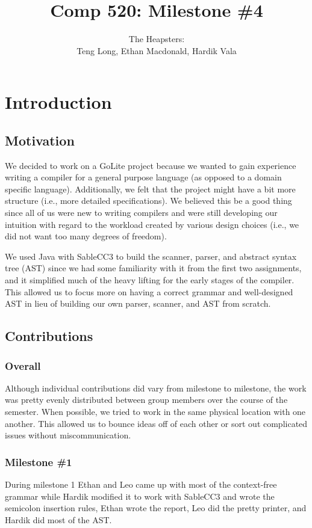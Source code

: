 \documentclass{article}
\title{Comp 520: Milestone \#4}
\author{The Heapsters: \\Teng Long, Ethan Macdonald, Hardik Vala}
\date{}
\begin{document}
\maketitle

\section{Introduction}

\subsection{Motivation}
We decided to work on a GoLite project because we wanted to gain experience writing a compiler for a general purpose language (as opposed to a domain specific language). Additionally, we felt that the project might have a bit more structure (i.e., more detailed specifications). We believed this be a good thing since all of us were new to writing compilers and were still developing our intuition with regard to the workload created by various design choices (i.e., we did not want too many degrees of freedom).

We used Java with SableCC3 to build the scanner, parser, and abstract syntax tree (AST) since we had some familiarity with it from the first two assignments, and it simplified much of the heavy lifting for the early stages of the compiler. This allowed us to focus more on having a correct grammar and well-designed AST in lieu of building our own parser, scanner, and AST from scratch.

\subsection{Contributions}
\subsubsection{Overall}
Although individual contributions did vary from milestone to milestone, the work was pretty evenly distributed between group members over the course of the semester. When possible, we tried to work in the same physical location with one another. This allowed us to bounce ideas off of each other or sort out complicated issues without miscommunication.

\subsubsection{Milestone \#1}
During milestone 1 Ethan and Leo came up with most of the context-free grammar while Hardik modified it to work with SableCC3 and wrote the semicolon insertion rules, Ethan wrote the report, Leo did the pretty printer, and Hardik did most of the AST. 
\end{document}
